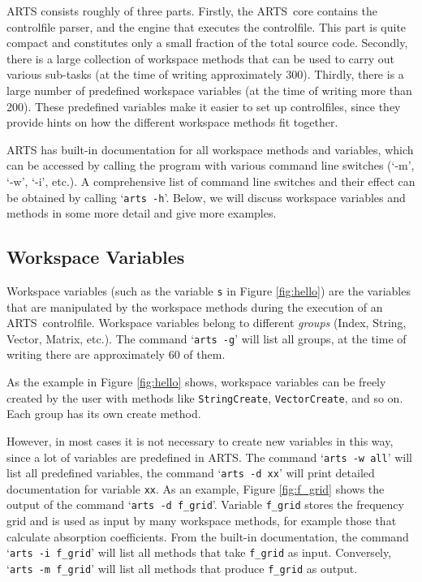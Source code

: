 ARTS consists roughly of three parts. Firstly, the ARTS\ core contains the
controlfile parser, and the engine that executes the controlfile. This part is
quite compact and constitutes only a small fraction of the total source code.
Secondly, there is a large collection of workspace methods that can be used to
carry out various sub-tasks (at the time of writing approximately 300).
Thirdly, there is a large number of predefined workspace variables (at the time
of writing more than 200). These predefined variables make it easier to set up
controlfiles, since they provide hints on how the different workspace methods
fit together.

ARTS has built-in documentation for all workspace methods and variables, which
can be accessed by calling the program with various command line switches
(`-m', `-w', `-i', etc.). A comprehensive list of command line switches and
their effect can be obtained by calling `\texttt{arts -h}'. Below, we will
discuss workspace variables and methods in some more detail and give more
examples.

\subsection{Workspace Variables}
%
Workspace variables (such as the variable \texttt{s} in Figure \ref{fig:hello})
are the variables that are manipulated by the workspace methods during the
execution of an ARTS\ controlfile. Workspace variables belong to different
\emph{groups} (Index, String, Vector, Matrix, etc.). The command `\texttt{arts
  -g}' will list all groups, at the time of writing there are approximately 60
of them.

As the example in Figure \ref{fig:hello} shows, workspace variables can be
freely created by the user with methods like \texttt{StringCreate},
\texttt{VectorCreate}, and so on. Each group has its own create method.

However, in most cases it is not necessary to create new variables in this way,
since a lot of variables are predefined in ARTS. The command `\texttt{arts -w
  all}' will list all predefined variables, the command `\texttt{arts -d xx}'
will print detailed documentation for variable \texttt{xx}. As an example,
Figure \ref{fig:f_grid} shows the output of the command `\texttt{arts -d
  f\_grid}'. Variable \texttt{f\_grid} stores the frequency grid and is used as
input by many workspace methods, for example those that calculate absorption
coefficients. From the built-in documentation, the command `\texttt{arts -i
  f\_grid}' will list all methods that take \texttt{f\_grid} as input.
Conversely, `\texttt{arts -m f\_grid}' will list all methods that produce
\texttt{f\_grid} as output.


